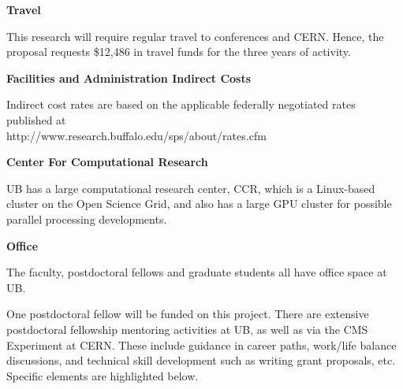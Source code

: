 \documentclass[times,11pt]{article}
\begin{document}
\bigskip
{\bf Travel}
\bigskip

This research will require regular travel to conferences and
CERN. Hence, the proposal requests
\$12,486 in travel funds for the three years of activity. 

\bigskip
{\bf Facilities and Administration Indirect Costs}
\bigskip

Indirect cost rates are based on the applicable federally negotiated
rates published at 
\\
http://www.research.buffalo.edu/sps/about/rates.cfm





\newpage
{}
\renewcommand{\thepage} {C--\arabic{page}}


\bigskip
{\bf Center For Computational Research}

UB has a large computational research center, CCR, which is a
Linux-based cluster on the Open Science Grid, and also has a large GPU
cluster for possible parallel processing developments. 

\bigskip
{\bf Office}

The faculty, postdoctoral fellows and graduate students all have
office space at UB. 


\newpage
{}
\renewcommand{\thepage} {D--\arabic{page}}

One postdoctoral fellow will be funded on this project. There are
extensive postdoctoral fellowship mentoring activities at UB, as well
as via the CMS
Experiment at CERN. These include guidance in career paths,
work/life balance discussions, and technical skill development such as
writing grant proposals, etc. Specific elements are highlighted
below. 
\end{document}
